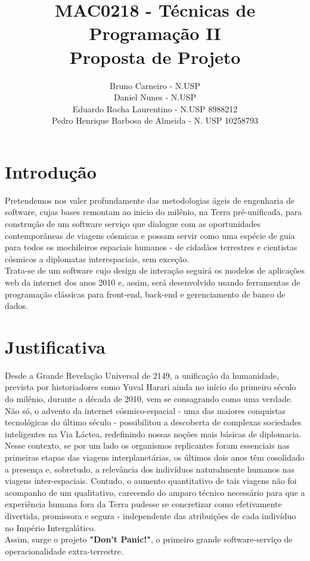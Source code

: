 \documentclass[12pt]{exam}
\title{MAC0218 - Técnicas de Programação II \\ Proposta de Projeto}
\author{Bruno Carneiro - N.USP \\ Daniel Nunes - N.USP \\ Eduardo Rocha Laurentino - N.USP 8988212 \\ Pedro Henrique Barbosa de Almeida - N. USP 10258793}
\date{}
\begin{document}
	\clearpage
	\pagestyle{plain}
	\maketitle
	
\section{Introdução}
	Pretendemos nos valer profundamente das metodologias ágeis de engenharia de software, cujas bases remontam ao inicio do milênio, na Terra pré-unificada, para construção de um software serviço que dialogue com as oportunidades contemporâneas de viagens cósmicas e possam servir como uma espécie de guia para todos os mochileiros espaciais humanos - de cidadãos terrestres e cientistas cósmicos a diplomatas interespaciais, sem exceção. 
	\\ Trata-se de um software cujo design de interação seguirá os modelos de aplicações web da internet dos anos 2010 e, assim, será desenvolvido usando ferramentas de programação clássicas para front-end, back-end e gerenciamento de banco de dados. 

\section{Justificativa}
	
	Desde a Grande Revelação Universal de 2149, a unificação da humanidade, prevista por historiadores como Yuval Harari ainda no início do primeiro século do milênio, durante a década de 2010, vem se consagrando como uma verdade. Não só, o advento da internet cósmico-espacial - uma das maiores conquistas tecnológicas do último século - possibilitou a descoberta de complexas sociedades inteligentes na Via Láctea, redefinindo nossas noções mais básicas de diplomacia.
	\\ Nesse contexto, se por um lado os organismos replicantes foram essenciais nas primeiras etapas das viagens interplanetárias, os últimos dois anos têm cosolidado a presença e, sobretudo, a relevância dos indivíduos naturalmente humanos nas viagens inter-espaciais. Contudo, o aumento quantitativo de tais viagens não foi acompanho de um qualitativo, carecendo do amparo técnico necessário para que a experiência humana fora da Terra pudesse se concretizar como efetivamente divertida, promissora e segura - independente das atribuições de cada indivíduo no Império Intergalático. 
    \\Assim, surge o projeto \textbf{"Don't Panic!"}, o primeiro grande software-serviço de operacionalidade extra-terrestre. 
	
\end{document}
